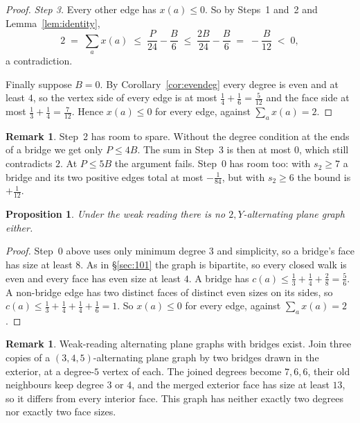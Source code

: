 \documentclass[11pt,a4paper]{amsart}
\theoremstyle{plain}
\newtheorem{proposition}[theorem]{Proposition}
\theoremstyle{definition}
\newtheorem{remark}[theorem]{Remark}
\begin{document}
\begin{proof}
\smallskip
\emph{Step 3.} Every other edge has $x(a) \le 0$. So by Steps~1 and~2 and
Lemma~\ref{lem:identity},
\[
  2 \;=\; \sum_a x(a) \;\le\; \frac{P}{24} - \frac{B}{6}
     \;\le\; \frac{2B}{24} - \frac{B}{6} \;=\; -\frac{B}{12} \;<\; 0 ,
\]
a contradiction.

\smallskip
Finally suppose $B = 0$. By Corollary~\ref{cor:evendeg} every degree is even and
at least $4$, so the vertex side of every edge is at most
$\tfrac14+\tfrac16 = \tfrac5{12}$ and the face side at most
$\tfrac13+\tfrac14 = \tfrac7{12}$. Hence $x(a) \le 0$ for every edge, against
$\sum_a x(a) = 2$.
\end{proof}

\begin{remark}
Step~2 has room to spare. Without the degree condition at the ends of a bridge
we get only $P \le 4B$. The sum in Step~3 is then at most $0$, which still
contradicts $2$. At $P \le 5B$ the argument fails. Step~0 has room too: with
$s_2 \ge 7$ a bridge and its two positive edges total at most $-\tfrac1{84}$,
but with $s_2 \ge 6$ the bound is $+\tfrac1{12}$.
\end{remark}

\begin{proposition}\label{prop:twoY-weak}
Under the weak reading there is no $2,Y$-alternating plane graph either.
\end{proposition}

\begin{proof}
Step~0 above uses only minimum degree $3$ and simplicity, so a bridge's face has
size at least $8$. As in \S\ref{sec:101} the graph is bipartite, so every closed
walk is even and every face has even size at least $4$. A bridge has
$c(a) \le \tfrac13 + \tfrac14 + \tfrac28 = \tfrac56$. A non-bridge edge has two
distinct faces of distinct even sizes on its sides, so
$c(a) \le \tfrac13+\tfrac14+\tfrac14+\tfrac16 = 1$. So $x(a) \le 0$ for every
edge, against $\sum_a x(a) = 2$.
\end{proof}

\begin{remark}
Weak-reading alternating plane graphs with bridges exist. Join three copies of a
$(3,4,5)$-alternating plane graph by two bridges drawn in the exterior, at a
degree-$5$ vertex of each. The joined degrees become $7,6,6$, their old
neighbours keep degree $3$ or $4$, and the merged exterior face has size at
least $13$, so it differs from every interior face. This graph has neither
exactly two degrees nor exactly two face sizes.
\end{remark}
\end{document}
